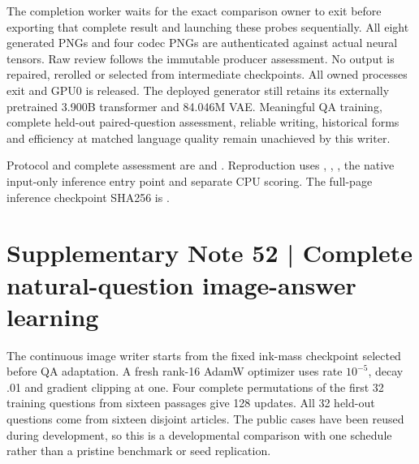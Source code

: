 \documentclass[10pt,a4paper]{article}
\begin{document}
The completion worker waits for the exact comparison owner to exit before
exporting that complete result and launching these probes sequentially.
All eight generated PNGs and four codec PNGs are authenticated against actual
neural tensors. Raw review follows the immutable producer assessment. No
output is repaired, rerolled or selected from intermediate checkpoints. All
owned processes exit and GPU0 is released. The deployed generator still
retains its externally pretrained 3.900B transformer and 84.046M VAE.
Meaningful QA training, complete held-out paired-question assessment, reliable
writing, historical forms and efficiency at matched language quality remain
unachieved by this writer.

{\footnotesize\raggedright
Protocol and complete assessment are
 and
.
Reproduction uses ,
,
, the native input-only
inference entry point and separate CPU scoring. The full-page inference
checkpoint SHA256 is
.\par}

\clearpage
{}


\clearpage
\section*{Supplementary Note 52 | Complete natural-question image-answer learning}
\label{note:native-qa-learning}
The continuous image writer starts from the fixed ink-mass checkpoint selected
before QA adaptation. A fresh rank-16 AdamW optimizer uses rate $10^{-5}$,
decay .01 and gradient clipping at one. Four complete permutations of the
first 32 training questions from sixteen passages give 128 updates. All 32
held-out questions come from sixteen disjoint articles. The public cases have
been reused during development, so this is a developmental comparison with
one schedule rather than a pristine benchmark or seed replication.
\end{document}
